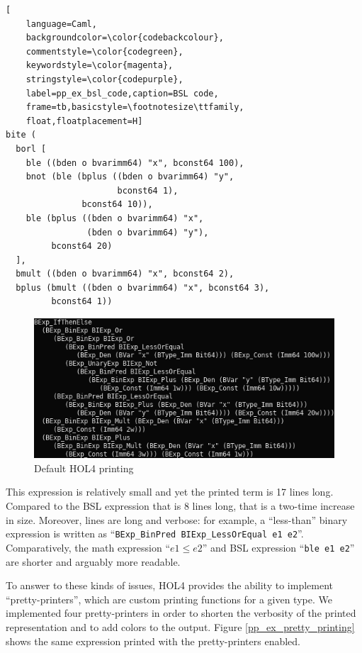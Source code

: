 \documentclass{kththesis}
\begin{document}
{\begin{lstlisting}[
    language=Caml,
    backgroundcolor=\color{codebackcolour},
    commentstyle=\color{codegreen},
    keywordstyle=\color{magenta},
    stringstyle=\color{codepurple},
    label=pp_ex_bsl_code,caption=BSL code,
    frame=tb,basicstyle=\footnotesize\ttfamily,
    float,floatplacement=H]
bite (
  borl [
    ble ((bden o bvarimm64) "x", bconst64 100),
    bnot (ble (bplus ((bden o bvarimm64) "y",
                      bconst64 1),
               bconst64 10)),
    ble (bplus ((bden o bvarimm64) "x",
                (bden o bvarimm64) "y"),
         bconst64 20)
  ],
  bmult ((bden o bvarimm64) "x", bconst64 2),
  bplus (bmult ((bden o bvarimm64) "x", bconst64 3),
         bconst64 1))
\end{lstlisting}

\begin{figure}[!h]
	\includegraphics[width=\textwidth]{figures/pp_ex_default_printing.png}
	\centering
	\caption{Default HOL4 printing}
	\label{pp_ex_default_printing}
\end{figure}

This expression is relatively small and yet the printed term is 17 lines long. Compared to the BSL expression that is 8 lines long\footnotemark, that is a two-time increase in size. Moreover, lines are long and verbose: for example, a ``less-than'' binary expression is written as ``\texttt{BExp\_BinPred BIExp\_LessOrEqual e1 e2}''. Comparatively, the math expression ``$e1 \leq e2$'' and BSL expression ``\texttt{ble e1 e2}'' are shorter and arguably more readable.


To answer to these kinds of issues, HOL4 provides the ability to implement ``pretty-printers'', which are custom printing functions for a given type. We implemented four pretty-printers in order to shorten the verbosity of the printed representation and to add colors to the output. Figure \ref{pp_ex_pretty_printing} shows the same expression printed with the pretty-printers enabled.

}
\end{document}
